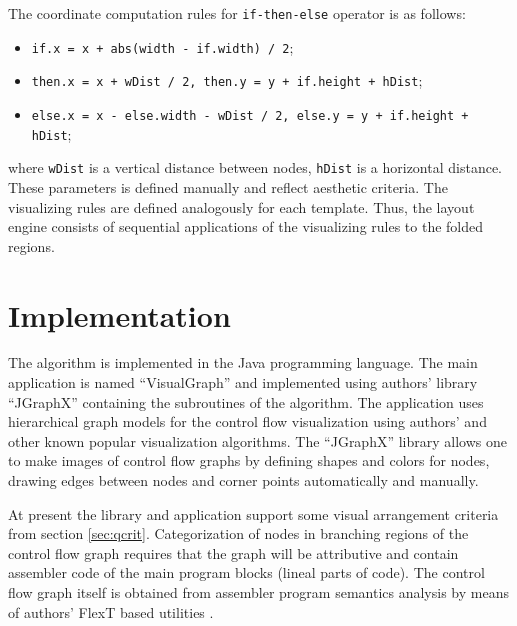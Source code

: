 \documentclass[conference]{IEEEtran}
\begin{document}
The coordinate computation rules for \texttt{if-then-else} operator is as follows:
\begin{itemize}
\item [] \texttt{if.x = x + abs(width - if.width) / 2};
\item [] \texttt{then.x = x  + wDist / 2, then.y = y + if.height + hDist};
\item [] \texttt{else.x = x - else.width - wDist / 2, else.y = y + if.height + hDist};
\end{itemize}
where \texttt{wDist} is a vertical distance between nodes, \texttt{hDist} is a horizontal distance.  These parameters is defined manually and reflect aesthetic criteria.  The visualizing rules are defined analogously for each template.  Thus, the layout engine consists of sequential applications of the visualizing rules to the folded regions.

\section{Implementation}
\label{sec:implementation}

The algorithm is implemented in the Java programming language.  The main application is named ``VisualGraph'' and implemented using authors' library ``JGraphX'' containing the subroutines of the algorithm.  The application uses hierarchical graph models for the control flow visualization using authors' and other known popular visualization algorithms.  The ``JGraphX'' library allows one to make images of control flow graphs by defining shapes and colors for nodes, drawing edges between nodes and corner points automatically and manually.

At present the library and application support some visual arrangement criteria from section \ref{sec:qcrit}.  Categorization of nodes in branching regions of the control flow graph requires that the graph will be attributive and contain assembler code of the main program blocks (lineal parts of code).  The control flow graph itself is obtained from assembler program semantics analysis by means of authors' FlexT based utilities \cite{flext}.

%
%
\end{document}
